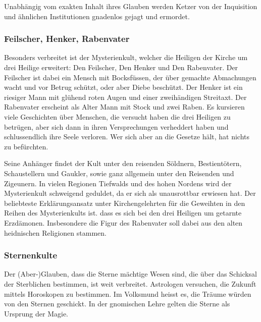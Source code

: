 \documentclass[12pt,twoside,twocolumn,openany]{book}
\begin{document}
	Unabhängig vom exakten Inhalt ihres Glauben werden Ketzer von der Inquisition und ähnlichen Institutionen gnadenlos gejagt und ermordet.
	

	\subsubsection{Feilscher, Henker, Rabenvater}
	Besonders verbreitet ist der Mysterienkult, welcher die Heiligen der Kirche um drei Heilige erweitert: Den Feilscher, Den Henker und Den Rabenvater.
	Der Feilscher ist dabei ein Mensch mit Bocksfüssen, der über gemachte Abmachungen wacht und vor Betrug schützt, oder aber Diebe beschützt. Der Henker ist ein riesiger Mann mit glühend roten Augen und einer zweihändigen Streitaxt. Der Rabenvater erscheint als Alter Mann mit Stock und zwei Raben. Es kursieren viele Geschichten über Menschen, die versucht haben die drei Heiligen zu betrügen, aber sich dann in ihren Versprechungen verheddert haben und schlussendlich ihre Seele verloren. Wer sich aber an die Gesetze hält, hat nichts zu befürchten.
	
	Seine Anhänger findet der Kult unter den reisenden Söldnern, Bestientötern, Schaustellern und Gaukler, sowie ganz allgemein unter den Reisenden und Zigeunern. In vielen Regionen Tiefwalds und des hohen Nordens wird der Mysterienkult schweigend geduldet, da er sich als unausrottbar erwiesen hat. Der beliebteste Erklärungsansatz unter Kirchengelehrten für die Geweihten in den Reihen des Mysterienkults ist. dass es sich bei den drei Heiligen um getarnte Erzdämonen. Insbesondere die Figur des Rabenvater soll dabei aus den alten heidnischen Religionen stammen.
	
	
	\subsubsection{Sternenkulte}
	Der (Aber-)Glauben, dass die Sterne mächtige Wesen sind, die über das Schicksal der Sterblichen bestimmen, ist weit verbreitet. Astrologen versuchen, die Zukunft mittels Horoskopen zu bestimmen. Im Volksmund heisst es, die Träume würden von den Sternen geschickt.
	In der gnomischen Lehre gelten die Sterne als Ursprung der Magie.
	
\end{document}
